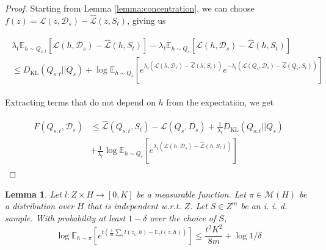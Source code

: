 \documentclass{article}
\theoremstyle{plain}
\newtheorem{lemma}[theorem]{Lemma}
\theoremstyle{definition}
\theoremstyle{remark}
\begin{document}
\begin{proof}
    Starting from Lemma \ref{lemma:concentration}, we can choose $f(z)=\mathcal{L}(z,\mathcal{D}_s)-\hat{\mathcal{L}}(z,S_t)$, giving us

\begin{align*}
\begin{split}
\lambda_t\mathbb{E}_{h\sim Q_{s:t}}\left [\mathcal{L}(h,\mathcal{D}_s)-\hat{\mathcal{L}}(h,S_t) \right ] - \lambda_t\mathbb{E}_{h\sim Q_{s}}\left [\mathcal{L}(h,\mathcal{D}_s)-\hat{\mathcal{L}}(h,S_t) \right ] \\
\leq D_{\mathrm{KL}}(Q_{s:t}||Q_{s})+\log\mathbb{E}_{h\sim Q_{s}}\left [e^{\lambda_t(\mathcal{L}(h,\mathcal{D}_s)-\hat{\mathcal{L}}(h,S_t))}e^{-\lambda_t(\mathcal{L}(Q_s,\mathcal{D}_s)-\hat{\mathcal{L}}(Q_s,S_t))} \right ]
\end{split}
\end{align*}

Extracting terms that do not depend on $h$ from the expectation, we get

\begin{align} \label{eq:forget-base}
\begin{split}
F(Q_{s:t},\mathcal{D}_s) &\leq \hat{\mathcal{L}}(Q_{s:t}, S_t) - \mathcal{L}(Q_{s}, D_s) + \frac{1}{\lambda_t} D_{\mathrm{KL}}(Q_{s:t}||Q_{s})\\
&+\frac{1}{\lambda_t}\log\mathbb{E}_{h\sim Q_{s}}\left [e^{\lambda_t(\mathcal{L}(h,\mathcal{D}_s)-\hat{\mathcal{L}}(h,S_t))} \right ]
\end{split}
\end{align}

\end{proof}

\begin{lemma} \label{lemma:hoeffding-concentration}
	Let $l:Z\times H\rightarrow[0,K]$ be a measurable function. Let $\pi\in\mathcal{M}(H)$ be a distribution over $H$ that is independent w.r.t. $Z$. Let $S\in Z^m$ be an i.\! i.\! d.\! sample. With probability at least $1-\delta$ over the choice of $S$,
%	
	$$\log \mathbb{E}_{h\sim \pi}\left [e^{t(\frac{1}{m}\sum_i l(z_i,h)-\mathbb{E}_{z}l(z,h))}\right ]\leq \frac{t^2K^2}{8m}+\log{1/ \delta}$$
\end{lemma}
\end{document}
